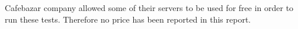 \documentclass[main.tex]{subfiles}
\begin{document}
Cafebazar company allowed some of their servers to be used for free in order to run these tests. Therefore no price has been reported in this report.
\end{document}

